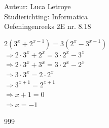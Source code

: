 \documentclass[a4paper]{article}
\begin{document}
  
\noindent \large Auteur: Luca Letroye        \\
\noindent \large Studierichting: Informatica \\
\noindent \large Oefeningenreeks 2E nr. 8.18 \\

\medskip

\normalsize

$2(3^x+2^{x-1}) = 3(2^x-3^{x-1})$\\

$\Rightarrow 2\cdot 3^x + 2^x = 3\cdot 2^x - 3^x$\\

$\Rightarrow 2 \cdot 3^x + 3^x = 3 \cdot 2^x - 2^x$\\

$\Rightarrow 3 \cdot 3^x = 2 \cdot 2^x$\\

$\Rightarrow   3^{x+1} =   2^{x+1}$\\

$\Rightarrow x+1 = 0$\\

$\Rightarrow x = -1$\\


\begin{thebibliography}{999}
\end{thebibliography}
\end{document}
